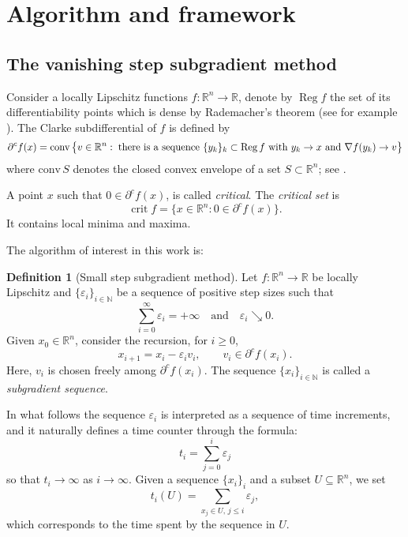 \documentclass[11pt]{article}
\theoremstyle{definition}
\newtheorem{defn}[thm]{Definition}
\theoremstyle{remark}
\DeclareMathOperator{\reg}{Reg}
\DeclareMathOperator{\crit}{crit}
\newcommand{\R}{\mathbb{R}}
\newcommand{\N}{\mathbb{N}}
\renewcommand{\geq}{\geqslant}
\renewcommand{\leq}{\leqslant}
\begin{document}
\section{Algorithm and framework}
\label{sec:algorithmframework}

\subsection{The vanishing step subgradient method}
\label{sec:smallstepsubgrad}
Consider a locally Lipschitz functions $f:\R^n\to\R$, denote by $\reg f$ the set of its differentiability points which is dense by Rademacher's theorem (see for example \cite[Theorem 3.2]{evans2015measure}). The  Clarke subdifferential of $f$ is defined by 
\begin{equation*}
\partial^cf(x)=\mbox{conv}\,\big\{v\in \R^n:\; \textrm{there is a sequence $ \{y_k\}_k\subset \reg f$ with $y_k\to x$ and $\nabla f(y_k)\to v$}  \big\}    
\end{equation*}
where $\mbox{conv}\,S$ denotes the closed convex envelope of a set $S\subset\R^n$; see \cite{clarke}.

A point $x$ such that $0\in\partial^cf(x)$, is called {\em critical}. The \emph{critical set}
is \[\crit f=\{x\in\R^n:0\in\partial^cf(x)\}. \]
It contains local minima and maxima.


The algorithm of interest in this work is:

\begin{defn}[Small step subgradient method] \label{def:subgradient}
Let $f\colon\R^n\to\R$ be locally Lipschitz and $\{\varepsilon_i\}_{i \in \N}$ be a sequence of positive step sizes such that %
\begin{equation}\label{eq:divergestep}
\sum_{i=0}^\infty\varepsilon_i=+\infty\quad\textrm{and}\quad\varepsilon_i\searrow0.
\end{equation}
Given $x_0 \in \R^n$, consider the recursion, for $i\geq 0$,
 \[x_{i+1}=x_i-\varepsilon_iv_i, \qquad v_i \in \partial^cf(x_i).\]
 Here, $v_i$ is chosen freely among $\partial^cf(x_i)$. The sequence $\{x_i\}_{i \in \N}$ is called a \emph{subgradient sequence}.
\end{defn}


In what follows the sequence $\varepsilon_i$ is interpreted as a sequence of time increments, and it naturally defines a time counter through the formula:
\[t_i=\sum_{j=0}^{i}\varepsilon_j\]
so that $t_i\to \infty$ as $i\to \infty$. Given a sequence $\{x_i\}_i$ and a  subset $U\subseteq \R^n$, we set 
\[t_i(U)=\sum_{x_j\in U,\, j\leq i} \varepsilon_j,\]
which corresponds to the time spent by the sequence in $U$.
%
\end{document}
